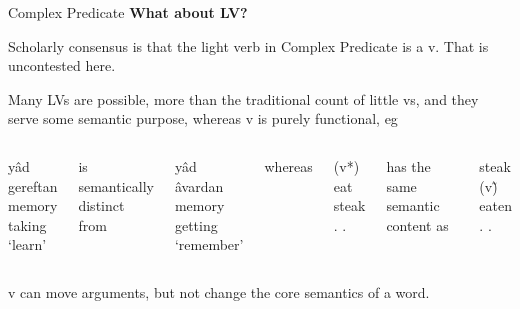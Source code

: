 \documentclass[10pt]{beamer}
\begin{document}
\begin{frame}[fragile]{Complex Predicate}
  \textbf{What about LV?} \pause

  Scholarly consensus is that the light verb in Complex Predicate is a v. That is uncontested here.

  Many LVs are possible, more than the traditional count of little vs, and they serve some semantic purpose, whereas v is purely functional, eg

  \begin{columns}
      \begin{exe}
        \ex
        \gll yâd gereftan\\
        memory taking\\
        \trans `learn'
      \end{exe}

      is semantically distinct from

      \begin{exe}
        \ex
        \gll yâd âvardan\\
        memory getting\\
        \trans `remember'
      \end{exe}

      whereas
      \begin{exe}
         \ex
        \gll (v*) eat steak\\
        . .\\
      \end{exe}
      
      has the same semantic content as

      \begin{exe}
         \ex
        \gll steak (v\~) eaten\\
        . .\\
      \end{exe}
  \end{columns}

  v can move arguments, but not change the core semantics of a word.

\end{frame}
\end{document}
